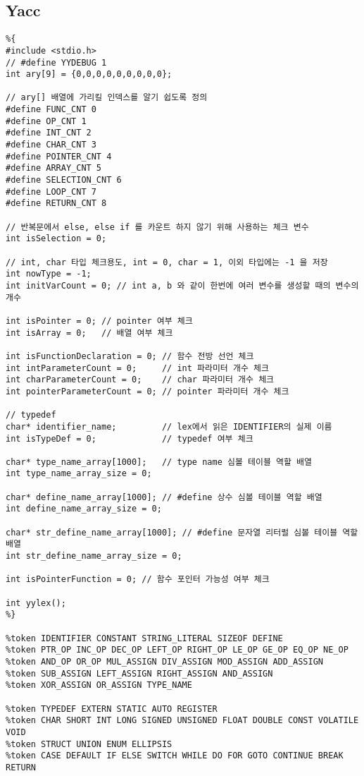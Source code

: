 \documentclass{article}
\begin{document}
\subsection{Yacc}
\begin{verbatim}
%{
#include <stdio.h>
// #define YYDEBUG 1
int ary[9] = {0,0,0,0,0,0,0,0,0};

// ary[] 배열에 가리킬 인덱스를 알기 쉽도록 정의
#define FUNC_CNT 0
#define OP_CNT 1
#define INT_CNT 2
#define CHAR_CNT 3
#define POINTER_CNT 4
#define ARRAY_CNT 5
#define SELECTION_CNT 6
#define LOOP_CNT 7
#define RETURN_CNT 8

// 반복문에서 else, else if 를 카운트 하지 않기 위해 사용하는 체크 변수
int isSelection = 0;

// int, char 타입 체크용도, int = 0, char = 1, 이외 타입에는 -1 을 저장
int nowType = -1;
int initVarCount = 0; // int a, b 와 같이 한번에 여러 변수를 생성할 때의 변수의 개수

int isPointer = 0; // pointer 여부 체크
int isArray = 0;   // 배열 여부 체크

int isFunctionDeclaration = 0; // 함수 전방 선언 체크
int intParameterCount = 0;     // int 파라미터 개수 체크
int charParameterCount = 0;    // char 파라미터 개수 체크
int pointerParameterCount = 0; // pointer 파라미터 개수 체크

// typedef
char* identifier_name;         // lex에서 읽은 IDENTIFIER의 실제 이름
int isTypeDef = 0;             // typedef 여부 체크

char* type_name_array[1000];   // type name 심볼 테이블 역할 배열
int type_name_array_size = 0;

char* define_name_array[1000]; // #define 상수 심볼 테이블 역할 배열
int define_name_array_size = 0;

char* str_define_name_array[1000]; // #define 문자열 리터럴 심볼 테이블 역할 배열
int str_define_name_array_size = 0;

int isPointerFunction = 0; // 함수 포인터 가능성 여부 체크

int yylex();
%}

%token IDENTIFIER CONSTANT STRING_LITERAL SIZEOF DEFINE
%token PTR_OP INC_OP DEC_OP LEFT_OP RIGHT_OP LE_OP GE_OP EQ_OP NE_OP
%token AND_OP OR_OP MUL_ASSIGN DIV_ASSIGN MOD_ASSIGN ADD_ASSIGN
%token SUB_ASSIGN LEFT_ASSIGN RIGHT_ASSIGN AND_ASSIGN
%token XOR_ASSIGN OR_ASSIGN TYPE_NAME

%token TYPEDEF EXTERN STATIC AUTO REGISTER
%token CHAR SHORT INT LONG SIGNED UNSIGNED FLOAT DOUBLE CONST VOLATILE VOID
%token STRUCT UNION ENUM ELLIPSIS
%token CASE DEFAULT IF ELSE SWITCH WHILE DO FOR GOTO CONTINUE BREAK RETURN


\end{verbatim}
\end{document}
